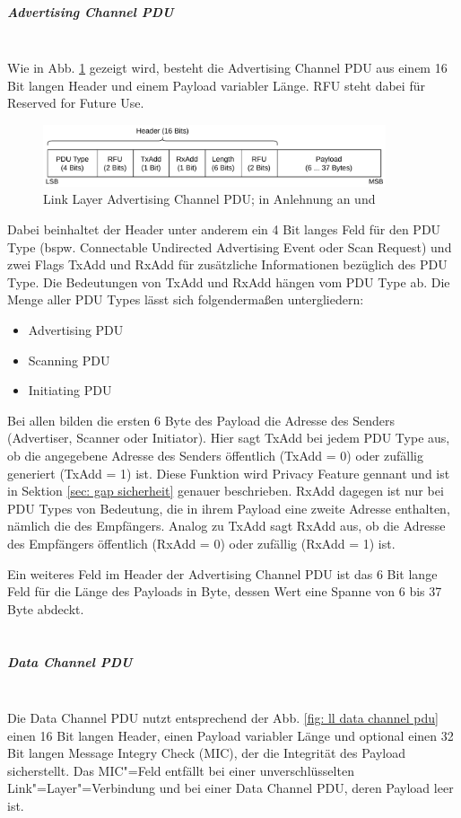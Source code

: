 \subparagraph{Advertising Channel PDU} \mbox{} \vspace{0.2cm} \\
Wie in Abb. \ref{fig: ll adv channel pdu} gezeigt wird, besteht die Advertising Channel PDU aus einem 16 Bit langen Header und einem Payload variabler Länge. RFU steht dabei für Reserved for Future Use.

\begin{figure}[H]
    \centering
    \includegraphics[width=0.9\textwidth]{graphics/link_layer_packetformat_pdu_adv.pdf}
    \caption[Link Layer Advertising Channel PDU]{Link Layer Advertising Channel PDU; in Anlehnung an \cite{BtSpec_fig_2201} und \cite{BtSpec_fig_2202}}
    \label{fig: ll adv channel pdu}
\end{figure}

Dabei beinhaltet der Header unter anderem ein 4 Bit langes Feld für den PDU Type (bspw. Connectable Undirected Advertising Event oder Scan Request) und zwei Flags TxAdd und RxAdd für zusätzliche Informationen bezüglich des PDU Type. Die Bedeutungen von TxAdd und RxAdd hängen vom PDU Type ab. Die Menge aller PDU Types lässt sich folgendermaßen untergliedern:
\begin{itemize}
    \item Advertising PDU
    \item Scanning PDU
    \item Initiating PDU
\end{itemize}
Bei allen bilden die ersten 6 Byte des Payload die Adresse des Senders (Advertiser, Scanner oder Initiator). Hier sagt TxAdd bei jedem PDU Type aus, ob die angegebene Adresse des Senders öffentlich (TxAdd = 0) oder zufällig generiert (TxAdd = 1) ist. Diese Funktion wird Privacy Feature gennant und ist in Sektion \ref{sec: gap sicherheit} genauer beschrieben. RxAdd dagegen ist nur bei PDU Types von Bedeutung, die in ihrem Payload eine zweite Adresse enthalten, nämlich die des Empfängers. Analog zu TxAdd sagt RxAdd aus, ob die Adresse des Empfängers öffentlich (RxAdd = 0) oder zufällig (RxAdd = 1) ist.

Ein weiteres Feld im Header der Advertising Channel PDU ist das 6 Bit lange Feld für die Länge des Payloads in Byte, dessen Wert eine Spanne von 6 bis 37 Byte abdeckt. \cite{BtSpec4.0_2201-2208}
\\\\
\subparagraph{Data Channel PDU} \mbox{} \vspace{0.2cm} \\
Die Data Channel PDU nutzt entsprechend der Abb. \ref{fig: ll data channel pdu} einen 16 Bit langen Header, einen Payload variabler Länge und optional einen 32 Bit langen Message Integry Check (MIC), der die Integrität des Payload sicherstellt. Das MIC"=Feld entfällt bei einer unverschlüsselten Link"=Layer"=Verbindung und bei einer Data Channel PDU, deren Payload leer ist.


